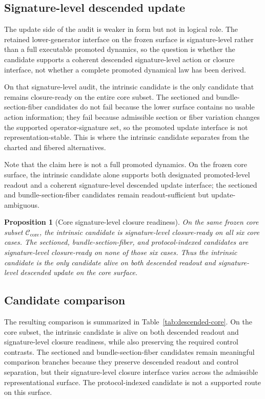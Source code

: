 \documentclass[11pt]{article}
\newtheorem{proposition}[theorem]{Proposition}
\theoremstyle{definition}
\begin{document}
\subsection{Signature-level descended update}

The update side of the audit is weaker in form but not in logical role. The retained lower-generator interface on the frozen surface is signature-level rather than a full executable promoted dynamics, so the question is whether the candidate supports a coherent descended signature-level action or closure interface, not whether a complete promoted dynamical law has been derived.

On that signature-level audit, the intrinsic candidate is the only candidate that remains closure-ready on the entire core subset. The sectioned and bundle-section-fiber candidates do not fail because the lower surface contains no usable action information; they fail because admissible section or fiber variation changes the supported operator-signature set, so the promoted update interface is not representation-stable. This is where the intrinsic candidate separates from the charted and fibered alternatives.

Note that the claim here is not a full promoted dynamics. On the frozen core surface, the intrinsic candidate alone supports both designated promoted-level readout and a coherent signature-level descended update interface; the sectioned and bundle-section-fiber candidates remain readout-sufficient but update-ambiguous.

\begin{proposition}[Core signature-level closure readiness]
\label{prop:signature-update-core}
On the same frozen core subset $\mathcal C_{\mathrm{core}}$, the intrinsic candidate is signature-level closure-ready on all six core cases. The sectioned, bundle-section-fiber, and protocol-indexed candidates are signature-level closure-ready on none of those six cases. Thus the intrinsic candidate is the only candidate alive on both descended readout and signature-level descended update on the core surface.
\end{proposition}

\subsection{Candidate comparison}

The resulting comparison is summarized in Table~\ref{tab:descended-core}. On the core subset, the intrinsic candidate is alive on both descended readout and signature-level closure readiness, while also preserving the required control contrasts. The sectioned and bundle-section-fiber candidates remain meaningful comparison branches because they preserve descended readout and control separation, but their signature-level closure interface varies across the admissible representational surface. The protocol-indexed candidate is not a supported route on this surface.
\end{document}
